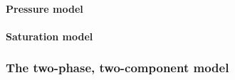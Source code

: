 \paragraph{Pressure model}


\paragraph{Saturation model}


\subsubsection{The two-phase, two-component model}\label{ch:2p2c_decoupled}



